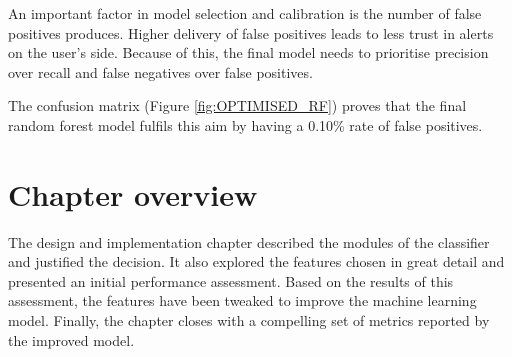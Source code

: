 An important factor in model selection and calibration is the number of false positives produces. Higher delivery of false positives leads to less trust in alerts on the user's side. Because of this, the final model needs to prioritise precision over recall and false negatives over false positives.

The confusion matrix (Figure \ref{fig:OPTIMISED_RF}) proves that the final random forest model fulfils this aim by having a 0.10\% rate of false positives.

\section{Chapter overview}
The design and implementation chapter described the modules of the classifier and justified the decision. It also explored the features chosen in great detail and presented an initial performance assessment. Based on the results of this assessment, the features have been tweaked to improve the machine learning model. Finally, the chapter closes with a compelling set of metrics reported by the improved model.